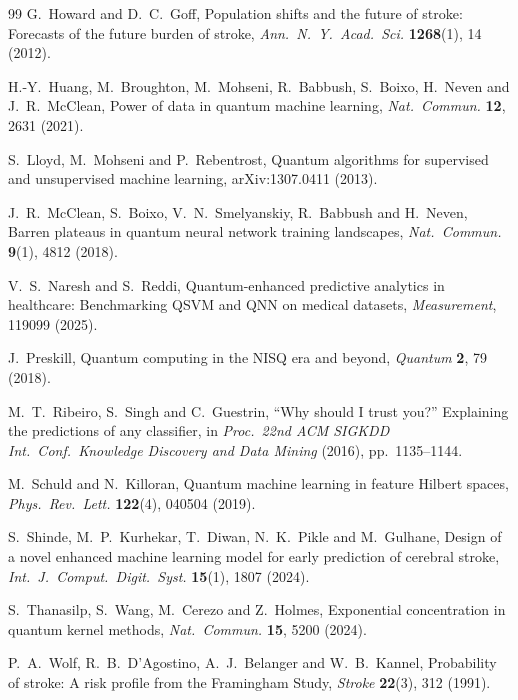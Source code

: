 \documentclass{ws-ijqi}
\begin{document}
\begin{thebibliography}{99}
G.~Howard and D.~C.~Goff,
Population shifts and the future of stroke: Forecasts of the future burden of
stroke, \textit{Ann.\ N.\ Y.\ Acad.\ Sci.} \textbf{1268}(1), 14 (2012).

H.-Y.~Huang, M.~Broughton, M.~Mohseni, R.~Babbush, S.~Boixo, H.~Neven and
J.~R.~McClean,
Power of data in quantum machine learning,
\textit{Nat.\ Commun.} \textbf{12}, 2631 (2021).

S.~Lloyd, M.~Mohseni and P.~Rebentrost,
Quantum algorithms for supervised and unsupervised machine learning,
arXiv:1307.0411 (2013).

J.~R.~McClean, S.~Boixo, V.~N.~Smelyanskiy, R.~Babbush and H.~Neven,
Barren plateaus in quantum neural network training landscapes,
\textit{Nat.\ Commun.} \textbf{9}(1), 4812 (2018).

V.~S.~Naresh and S.~Reddi,
Quantum-enhanced predictive analytics in healthcare: Benchmarking QSVM and QNN
on medical datasets, \textit{Measurement}, 119099 (2025).

J.~Preskill, Quantum computing in the NISQ era and beyond,
\textit{Quantum} \textbf{2}, 79 (2018).

M.~T.~Ribeiro, S.~Singh and C.~Guestrin,
``Why should I trust you?'' Explaining the predictions of any classifier, in
\textit{Proc.\ 22nd ACM SIGKDD Int.\ Conf.\ Knowledge Discovery and Data
Mining} (2016), pp.~1135--1144.

M.~Schuld and N.~Killoran,
Quantum machine learning in feature Hilbert spaces,
\textit{Phys.\ Rev.\ Lett.} \textbf{122}(4), 040504 (2019).

S.~Shinde, M.~P.~Kurhekar, T.~Diwan, N.~K.~Pikle and M.~Gulhane,
Design of a novel enhanced machine learning model for early prediction of
cerebral stroke, \textit{Int.\ J.\ Comput.\ Digit.\ Syst.} \textbf{15}(1),
1807 (2024).

S.~Thanasilp, S.~Wang, M.~Cerezo and Z.~Holmes,
Exponential concentration in quantum kernel methods,
\textit{Nat.\ Commun.} \textbf{15}, 5200 (2024).

P.~A.~Wolf, R.~B.~D'Agostino, A.~J.~Belanger and W.~B.~Kannel,
Probability of stroke: A risk profile from the Framingham Study,
\textit{Stroke} \textbf{22}(3), 312 (1991).

\end{thebibliography}
\end{document}
